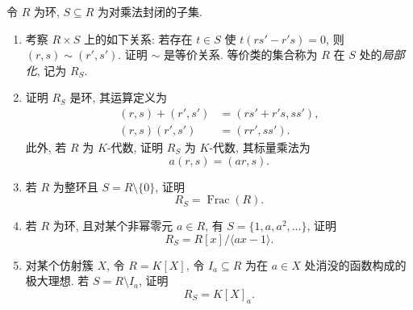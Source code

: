 \begin{BookExercises}
  \item\label{ex:construction-and-examples-of-ring-localization} 令 $R$ 为环, $S\subseteq R$ 为对乘法封闭的子集.
  \begin{enumerate}
    \item 考察 $R\times S$ 上的如下关系: 若存在 $t\in S$ 使 $t(rs'-r's)=0$, 则 $(r,s)\sim(r',s')$. 证明 $\sim$ 是等价关系. 等价类的集合称为 $R$ 在 $S$ 处的\emph{局部化}, 记为 $R_{S}$.
    \item 证明 $R_{S}$ 是环, 其运算定义为
    \[
      \begin{aligned}
      (r,s)+(r',s')&=(rs'+r's,ss'),\\
      (r,s)(r',s')&=(rr',ss').
      \end{aligned}
    \]
    此外, 若 $R$ 为 $K$-代数, 证明 $R_{S}$ 为 $K$-代数, 其标量乘法为
    \[
      a(r,s)=(ar,s).
    \]
    \item 若 $R$ 为整环且 $S=R\setminus\{0\}$, 证明
    \[
      R_{S}=\operatorname{Frac}(R).
    \]
    \item 若 $R$ 为环, 且对某个非幂零元 $a\in R$, 有 $S=\{1,a,a^{2},\ldots\}$, 证明
    \[
      R_{S}=R[x]/\langle ax-1\rangle.
    \]
    \item 对某个仿射簇 $X$, 令 $R=K[X]$, 令 $I_{a}\subseteq R$ 为在 $a\in X$ 处消没的函数构成的极大理想. 若 $S=R\setminus I_{a}$, 证明
    \[
      R_{S}=K[X]_{a}.
    \]
  \end{enumerate}
\end{BookExercises}
